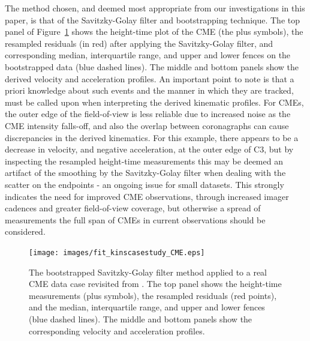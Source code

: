 \documentclass[structabstract]{aa}
\begin{document}
The method chosen, and deemed most appropriate from our investigations in this paper, is that of the Savitzky-Golay filter and bootstrapping technique. The top panel of Figure~\ref{fig_savgol_CME} shows the height-time plot of the CME (the plus symbols), the resampled residuals (in red) after applying the Savitzky-Golay filter, and corresponding median, interquartile range, and upper and lower fences on the bootstrapped data (blue dashed lines). The middle and bottom panels show the derived velocity and acceleration profiles. An important point to note is that a priori knowledge about such events and the manner in which they are tracked, must be called upon when interpreting the derived kinematic profiles. For CMEs, the outer edge of the field-of-view is less reliable due to increased noise as the CME intensity falls-off, and also the overlap between coronagraphs can cause discrepancies in the derived kinematics. For this example, there appears to be a decrease in velocity, and negative acceleration, at the outer edge of C3, but by inspecting the resampled height-time measurements this may be deemed an artifact of the smoothing by the Savitzky-Golay filter when dealing with the scatter on the endpoints - an ongoing issue for small datasets. This strongly indicates the need for improved CME observations, through increased imager cadences and greater field-of-view coverage, but otherwise a spread of measurements the full span of CMEs in current observations should be considered.


\begin{figure}
\centering
\texttt{[image: images/fit\_kinscasestudy\_CME.eps]}
\caption{The bootstrapped Savitzky-Golay filter method applied to a real CME data case revisited from \citealt{2009A&A...495..325B}. The top panel shows the height-time measurements (plus symbols), the resampled residuals (red points), and the median, interquartile range, and upper and lower fences (blue dashed lines). The middle and bottom panels show the corresponding velocity and acceleration profiles.}
\label{fig_savgol_CME}
\end{figure}
\end{document}
